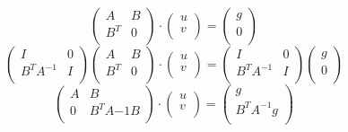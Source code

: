 \documentclass[a4paper,11pt]{scrartcl}
\begin{document}
\[
   \begin{pmatrix}
      A & B \\
      B^T & 0 \\
   \end{pmatrix} \cdot \begin{pmatrix}
      u\\
      v\\
   \end{pmatrix}  = \begin{pmatrix}
      g\\
      0\\
   \end{pmatrix}
   \]
\[
   \begin{pmatrix}
      I & 0\\
      B^T A^{-1} & I \\
   \end{pmatrix}
   \begin{pmatrix}
      A & B \\
      B^T & 0 \\
   \end{pmatrix} \cdot \begin{pmatrix}
      u\\
      v\\
   \end{pmatrix}  = 
   \begin{pmatrix}
      I & 0\\
      B^T A^{-1} & I \\
   \end{pmatrix}
   \begin{pmatrix}
      g\\
      0\\
   \end{pmatrix}
   \]
\[
   \begin{pmatrix}
      A & B \\
      0 & B^TA{-1}B \\
   \end{pmatrix} \cdot \begin{pmatrix}
      u\\
      v\\
   \end{pmatrix}  = \begin{pmatrix}
      g\\
      B^TA^{-1}g\\
   \end{pmatrix}
   \]
\end{document}

